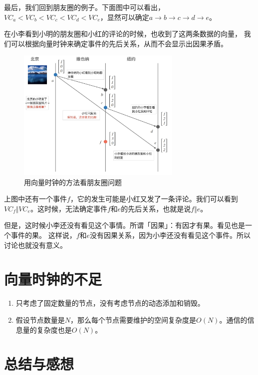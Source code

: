 \documentclass[cn,11pt,chinese]{elegantbook}
\begin{document}
最后，我们回到朋友圈的例子。下面图中可以看出，$VC_a < VC_b < VC_c < VC_d < VC_e$，显然可以确定$a \rightarrow b \rightarrow c \rightarrow d \rightarrow e$。

在小李看到小明的朋友圈和小红的评论的时候，也收到了这两条数据的向量， 我们可以根据向量时钟来确定事件的先后关系，从而不会显示出因果矛盾。

\begin{figure}
    \centering
    \includegraphics[width=0.7\textwidth]{images/appendix-a-17.jpeg}
    \caption{用向量时钟的方法看朋友圈问题}
\end{figure}

上图中还有一个事件$f$，它的发生可能是小红又发了一条评论。我们可以看到$VC_f \Vert VC_e$。这时候，无法确定事件$f$和$e$的先后关系，也就是说$f \Vert e$。

但是，这时候小李还没有看见这个事情。所谓「因果」：有因才有果。看见也是一个事件的果。 这样说，$f$和$e$没有因果关系，因为小李还没有看见这个事件。所以讨论也就没有意义。

\section{向量时钟的不足}

\begin{enumerate}
    \item 只考虑了固定数量的节点，没有考虑节点的动态添加和销毁。
    \item 假设节点数量是$N$，那么每个节点需要维护的空间复杂度是$O(N)$。通信的信息量的复杂度也是$O(N)$。
\end{enumerate}

\section{总结与感想}
\end{document}
